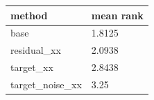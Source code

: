 \begin{tabular}{ll}
\toprule
method & mean rank \\
\midrule
base & 1.8125 \\
residual\_xx & 2.0938 \\
target\_xx & 2.8438 \\
target\_noise\_xx & 3.25 \\
\bottomrule
\end{tabular}
